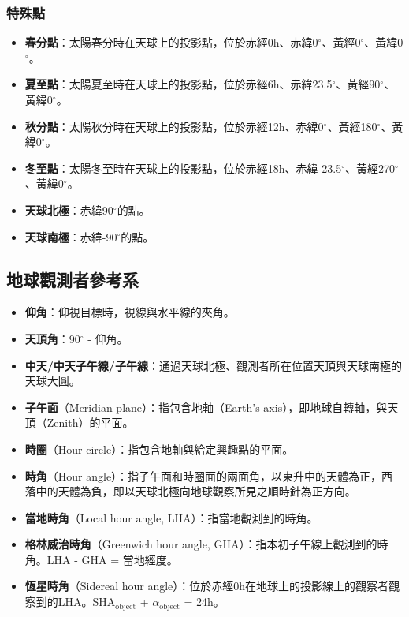 \documentclass[a4paper,12pt]{report}
\begin{document}
\subsubsection{特殊點}
\begin{itemize}
    \item \textbf{春分點}：太陽春分時在天球上的投影點，位於赤經0h、赤緯0$^\circ$、黃經0$^\circ$、黃緯0$^\circ$。
    \item \textbf{夏至點}：太陽夏至時在天球上的投影點，位於赤經6h、赤緯23.5$^\circ$、黃經90$^\circ$、黃緯0$^\circ$。
    \item \textbf{秋分點}：太陽秋分時在天球上的投影點，位於赤經12h、赤緯0$^\circ$、黃經180$^\circ$、黃緯0$^\circ$。
    \item \textbf{冬至點}：太陽冬至時在天球上的投影點，位於赤經18h、赤緯-23.5$^\circ$、黃經270$^\circ$、黃緯0$^\circ$。
    \item \textbf{天球北極}：赤緯90$^\circ$的點。
    \item \textbf{天球南極}：赤緯-90$^\circ$的點。
\end{itemize}
\subsection{地球觀測者參考系}
\begin{itemize}
\item \textbf{仰角}：仰視目標時，視線與水平線的夾角。
\item \textbf{天頂角}：90$^\circ$ - 仰角。
\item \textbf{中天/中天子午線/子午線}：通過天球北極、觀測者所在位置天頂與天球南極的天球大圓。
\item \textbf{子午面}（Meridian plane）：指包含地軸（Earth's axis），即地球自轉軸，與天頂（Zenith）的平面。
\item \textbf{時圈}（Hour circle）：指包含地軸與給定興趣點的平面。
\item \textbf{時角}（Hour angle）：指子午面和時圈面的兩面角，以東升中的天體為正，西落中的天體為負，即以天球北極向地球觀察所見之順時針為正方向。
\item \textbf{當地時角}（Local hour angle, LHA）：指當地觀測到的時角。
\item \textbf{格林威治時角}（Greenwich hour angle, GHA）：指本初子午線上觀測到的時角。LHA - GHA = 當地經度。
\item \textbf{恆星時角}（Sidereal hour angle）：位於赤經0h在地球上的投影線上的觀察者觀察到的LHA。SHA$_{\text{object}}$ + $\alpha_{\text{object}}$ = 24h。
\end{itemize}
\end{document}
